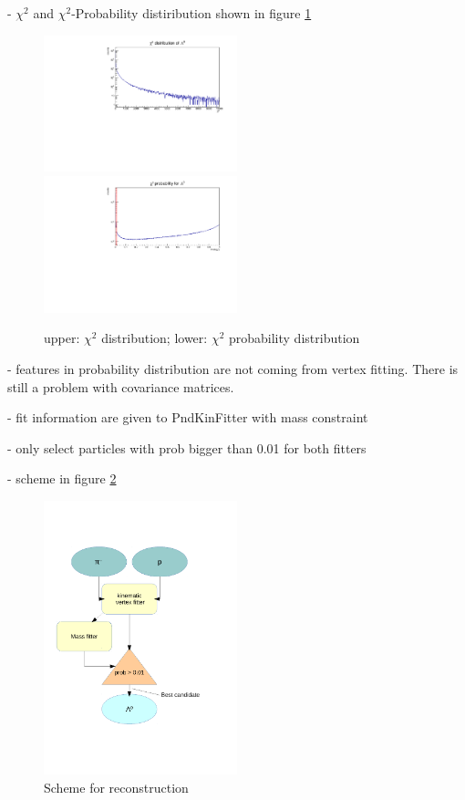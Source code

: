		- $\chi^{2}$ and $\chi^{2}$-Probability distiribution shown in figure \ref{fig:lambda_chi2}
		
		\begin{figure}
			\centering
				\includegraphics[width=0.50\textwidth]{./plots/lambda0/lambda0_chisqrt.pdf}
				\includegraphics [width=0.50\textwidth]{./plots/lambda0/lambda0_prob.pdf}
			\caption{upper: $\chi^{2}$ distribution; lower: $\chi^{2}$ probability distribution}
			\label{fig:lambda_chi2}
		\end{figure}
		
		- features in probability distribution are not coming from vertex fitting. There is still a problem with covariance matrices.
		
		- fit information are given to PndKinFitter with mass constraint
		
		- only select particles with prob bigger than 0.01 for both fitters
		
		- scheme in figure \ref{fig:lambda_scheme}
		
		\begin{figure}
			\centering
				\includegraphics[width=0.50\textwidth]{./plots/combineLambda0.pdf}
			\caption{Scheme for \lam reconstruction}
			\label{fig:lambda_scheme}
		\end{figure}
		
